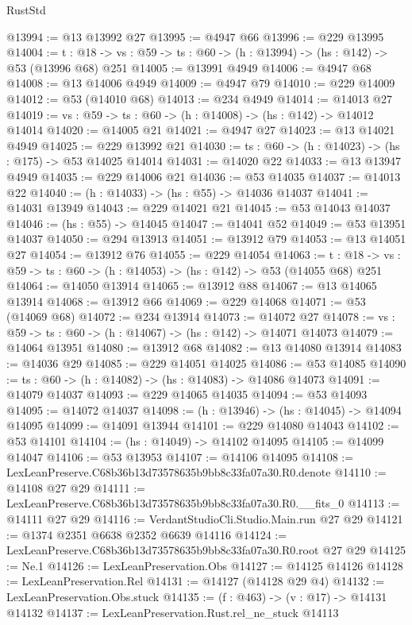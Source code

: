 \begin{lexlean}{RustStd}
\begin{coremodule}
@13994 := @13 @13992 @27
@13995 := @4947 @66
@13996 := @229 @13995
@14004 := {t : @18} ->
  {vs : @59} -> {ts : @60} -> (h : @13994) -> (hs : @142) -> @53 (@13996 @68) @251
@14005 := @13991 @4949
@14006 := @4947 @68
@14008 := @13 @14006 @4949
@14009 := @4947 @79
@14010 := @229 @14009
@14012 := @53 (@14010 @68)
@14013 := @234 @4949
@14014 := @14013 @27
@14019 := {vs : @59} -> {ts : @60} -> (h : @14008) -> (hs : @142) -> @14012 @14014
@14020 := @14005 @21
@14021 := @4947 @27
@14023 := @13 @14021 @4949
@14025 := @229 @13992 @21
@14030 := {ts : @60} -> (h : @14023) -> (hs : @175) -> @53 @14025 @14014
@14031 := @14020 @22
@14033 := @13 @13947 @4949
@14035 := @229 @14006 @21
@14036 := @53 @14035
@14037 := @14013 @22
@14040 := (h : @14033) -> (hs : @55) -> @14036 @14037
@14041 := @14031 @13949
@14043 := @229 @14021 @21
@14045 := @53 @14043 @14037
@14046 := (hs : @55) -> @14045
@14047 := @14041 @52
@14049 := @53 @13951 @14037
@14050 := @294 @13913
@14051 := @13912 @79
@14053 := @13 @14051 @27
@14054 := @13912 @76
@14055 := @229 @14054
@14063 := {t : @18} ->
  {vs : @59} -> {ts : @60} -> (h : @14053) -> (hs : @142) -> @53 (@14055 @68) @251
@14064 := @14050 @13914
@14065 := @13912 @88
@14067 := @13 @14065 @13914
@14068 := @13912 @66
@14069 := @229 @14068
@14071 := @53 (@14069 @68)
@14072 := @234 @13914
@14073 := @14072 @27
@14078 := {vs : @59} -> {ts : @60} -> (h : @14067) -> (hs : @142) -> @14071 @14073
@14079 := @14064 @13951
@14080 := @13912 @68
@14082 := @13 @14080 @13914
@14083 := @14036 @29
@14085 := @229 @14051 @14025
@14086 := @53 @14085
@14090 := {ts : @60} -> (h : @14082) -> (hs : @14083) -> @14086 @14073
@14091 := @14079 @14037
@14093 := @229 @14065 @14035
@14094 := @53 @14093
@14095 := @14072 @14037
@14098 := (h : @13946) -> (hs : @14045) -> @14094 @14095
@14099 := @14091 @13944
@14101 := @229 @14080 @14043
@14102 := @53 @14101
@14104 := (hs : @14049) -> @14102 @14095
@14105 := @14099 @14047
@14106 := @53 @13953
@14107 := @14106 @14095
@14108 := LexLeanPreserve.C68b36b13d73578635b9bb8c33fa07a30.R0.denote
@14110 := @14108 @27 @29
@14111 := LexLeanPreserve.C68b36b13d73578635b9bb8c33fa07a30.R0.__fits_0
@14113 := @14111 @27 @29
@14116 := VerdantStudioCli.Studio.Main.run @27 @29
@14121 := @1374 @2351 @6638 @2352 @6639 @14116
@14124 := LexLeanPreserve.C68b36b13d73578635b9bb8c33fa07a30.R0.root @27 @29
@14125 := Ne.{1}
@14126 := LexLeanPreservation.Obs
@14127 := @14125 @14126
@14128 := LexLeanPreservation.Rel
@14131 := @14127 (@14128 @29 @4)
@14132 := LexLeanPreservation.Obs.stuck
@14135 := (f : @463) -> (v : @17) -> @14131 @14132
@14137 := LexLeanPreservation.Rust.rel_ne_stuck @14113

\end{coremodule}
\end{lexlean}
